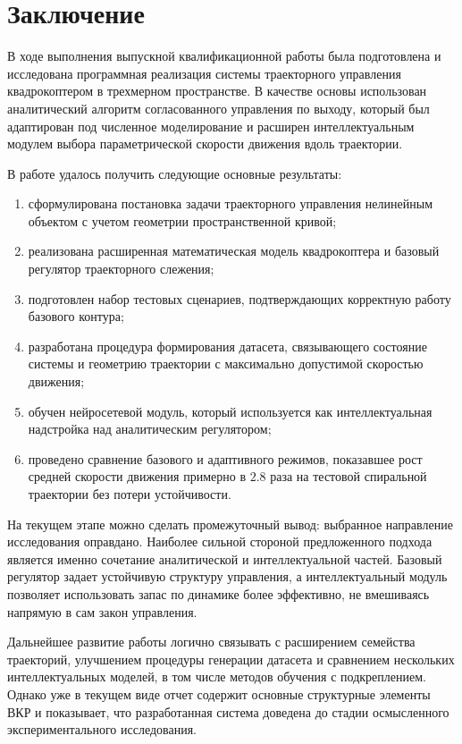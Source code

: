 \chapter*{Заключение}

В ходе выполнения выпускной квалификационной работы была подготовлена и исследована программная реализация системы траекторного управления квадрокоптером в трехмерном пространстве. В качестве основы использован аналитический алгоритм согласованного управления по выходу, который был адаптирован под численное моделирование и расширен интеллектуальным модулем выбора параметрической скорости движения вдоль траектории.

В работе удалось получить следующие основные результаты:
\begin{enumerate}
    \item сформулирована постановка задачи траекторного управления нелинейным объектом с учетом геометрии пространственной кривой;
    \item реализована расширенная математическая модель квадрокоптера и базовый регулятор траекторного слежения;
    \item подготовлен набор тестовых сценариев, подтверждающих корректную работу базового контура;
    \item разработана процедура формирования датасета, связывающего состояние системы и геометрию траектории с максимально допустимой скоростью движения;
    \item обучен нейросетевой модуль, который используется как интеллектуальная надстройка над аналитическим регулятором;
    \item проведено сравнение базового и адаптивного режимов, показавшее рост средней скорости движения примерно в $2.8$ раза на тестовой спиральной траектории без потери устойчивости.
\end{enumerate}

На текущем этапе можно сделать промежуточный вывод: выбранное направление исследования оправдано. Наиболее сильной стороной предложенного подхода является именно сочетание аналитической и интеллектуальной частей. Базовый регулятор задает устойчивую структуру управления, а интеллектуальный модуль позволяет использовать запас по динамике более эффективно, не вмешиваясь напрямую в сам закон управления.

Дальнейшее развитие работы логично связывать с расширением семейства траекторий, улучшением процедуры генерации датасета и сравнением нескольких интеллектуальных моделей, в том числе методов обучения с подкреплением. Однако уже в текущем виде отчет содержит основные структурные элементы ВКР и показывает, что разработанная система доведена до стадии осмысленного экспериментального исследования.

